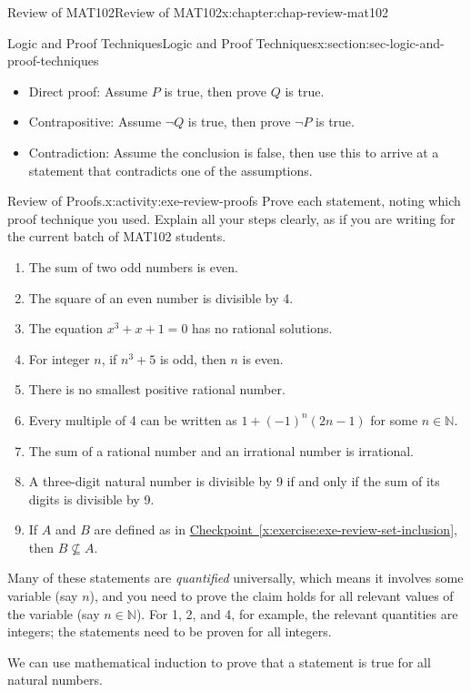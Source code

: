\documentclass[oneside,10pt,]{book}
\newcommand{\xreffont}{\relax}
\numberwithin{equation}{section}
\begin{document}
\begin{chapterptx}{Review of MAT102}{}{Review of MAT102}{}{}{x:chapter:chap-review-mat102}
\begin{sectionptx}{Logic and Proof Techniques}{}{Logic and Proof Techniques}{}{}{x:section:sec-logic-and-proof-techniques}
\par
%
\begin{itemize}[label=\textbullet]
\item{}Direct proof: Assume \(P\) is true, then prove \(Q\) is true.%
\item{}Contrapositive: Assume \(\neg Q\) is true, then prove \(\neg P\) is true.%
\item{}Contradiction: Assume the conclusion is false, then use this to arrive at a statement that contradicts one of the assumptions.%
\end{itemize}
%
\begin{activity}{Review of Proofs.}{x:activity:exe-review-proofs}%
Prove each statement, noting which proof technique you used. Explain all your steps clearly, as if you are writing for the current batch of MAT102 students.%
\begin{enumerate}[label=(\alph*)]
\item{}The sum of two odd numbers is even.%
\item{}The square of an even number is divisible by 4.%
\item{}The equation \(x^3 + x + 1 = 0\) has no rational solutions.%
\item{}For integer \(n\), if \(n^3 + 5\) is odd, then \(n\) is even.%
\item{}There is no smallest positive rational number.%
\item{}Every multiple of 4 can be written as \(1 + (-1)^n(2n-1)\) for some \(n \in \mathbb{N}\).%
\item{}The sum of a rational number and an irrational number is irrational.%
\item{}A three-digit natural number is divisible by 9 if and only if the sum of its digits is divisible by 9.%
\item{}If \(A\) and \(B\) are defined as in \hyperref[x:exercise:exe-review-set-inclusion]{Checkpoint~{\xreffont\ref{x:exercise:exe-review-set-inclusion}}}, then \(B \not\subseteq A\).%
\end{enumerate}
%
\end{activity}
Many of these statements are \emph{quantified} universally, which means it involves some variable (say \(n\)), and you need to prove the claim holds for all relevant values of the variable (say \(n \in \mathbb{N}\)). For 1, 2, and 4, for example, the relevant quantities are integers; the statements need to be proven for all integers.%
\par
We can use mathematical induction to prove that a statement is true for all natural numbers.%

\end{sectionptx}
\end{chapterptx}
\end{document}
